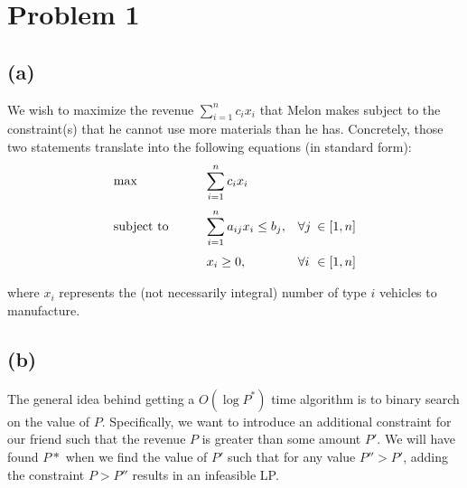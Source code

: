 \documentclass{6046}
\author{Matthew Feng}
\begin{document}
\section*{Problem 1}

\subsection*{(a)}
We wish to maximize the revenue $\sum_{i = 1}^{n}c_ix_i$
that Melon makes subject to the constraint(s) that he cannot
use more materials than he has. Concretely, those two
statements translate into the following equations
(in standard form):
\begin{displaymath}
\begin{matrix*}[l]
\max              & {\displaystyle \qquad \sum_{i = 1}^{n}c_ix_i }\\
\vspace{-0.5em}\\
\text{subject to} & {\displaystyle \qquad \sum_{i = 1}^{n}a_{ij}x_i \le b_j},
                  & \forall j           &\hspace{-0.5em}\in [1, n]\\
\vspace{-0.5em}\\
                  & \qquad x_i \ge 0,
                  & \forall i           &\hspace{-0.5em} \in [1, n]
\end{matrix*}
\end{displaymath}

where $x_i$ represents the (not necessarily integral) number
of type $i$ vehicles to manufacture.

\subsection*{(b)}
The general idea behind getting a $O(\log P^*)$ time algorithm
is to binary search on the value of $P$. Specifically, we want
to introduce an additional constraint for our friend such that
the revenue $P$ is greater than some amount $P'$. We will have
found $P*$ when we find the value of $P'$ such that for any value
$P'' > P'$, adding the constraint $P > P''$ results in an
infeasible LP.
\end{document}

